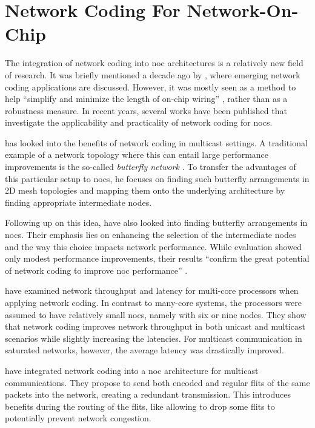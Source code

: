 \section{Network Coding For Network-On-Chip}
The integration of network coding into \gls{noc} architectures is a relatively new field of research. It was briefly mentioned a decade ago by
\citeauthor{fragouli08ncapplications} \cite{fragouli08ncapplications}, where emerging network coding applications are discussed. However, it was
mostly seen as a method to help \enquote{simplify and minimize the length of on-chip wiring} \cite[260]{fragouli08ncapplications}, rather than as a
robustness measure. In recent years, several works have been published that investigate the applicability and practicality of network coding for
\glspl{noc}.

\citeauthor{indrusiak11ncfornocs} \cite{indrusiak11ncfornocs} has looked into the benefits of network coding in multicast settings. A traditional
example of a network topology where this can entail large performance improvements is the so-called \textit{butterfly network} \cites(cf.)(){ahlswede00networkflow}{li03linearnc}.
To transfer the advantages of this particular setup to \glspl{noc}, he focuses on finding such butterfly arrangements in 2D mesh topologies and
mapping them onto the underlying architecture by finding appropriate intermediate nodes.

Following up on this idea, \citeauthor{shalaby12nodeselection} \cite{shalaby12nodeselection} have also looked into finding butterfly arrangements in
\glspl{noc}. Their emphasis lies on enhancing the selection of the intermediate nodes and the way this choice impacts network performance. While
evaluation showed only modest performance improvements, their results \enquote{confirm the great potential of network coding to improve \gls{noc}
performance} \cite[5]{shalaby12nodeselection}.

\citeauthor{duongba11ncinmulticore} \cite{duongba11ncinmulticore} have examined network throughput and latency for multi-core processors when applying
network coding. In contrast to many-core systems, the processors were assumed to have relatively small \glspl{noc}, namely with six or nine nodes.
They show that network coding improves network throughput in both unicast and multicast scenarios while slightly increasing the latencies. For
multicast communication in saturated networks, however, the average latency was drastically improved.

\citeauthor{xue15ncnoc} \cite{xue15ncnoc} have integrated network coding into a \gls{noc} architecture for multicast communications. They propose to
send both encoded and regular flits of the same packets into the network, creating a redundant transmission. This introduces benefits during the
routing of the flits, like allowing to drop some flits to potentially prevent network congestion.

